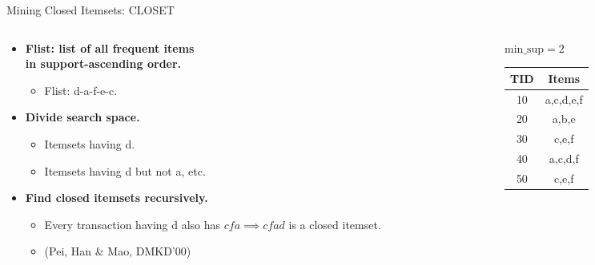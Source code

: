 \begin{frame}{Mining Closed Itemsets: CLOSET}
	\begin{columns}
		\begin{column}{0.6\textwidth}
			\begin{itemize}
				\item \textbf{Flist: list of all frequent items \\ in 
				support-ascending order.}
				\begin{itemize}
					\item Flist: d-a-f-e-c.
				\end{itemize}
				\item \textbf{Divide search space.}
				\begin{itemize}
					\item Itemsets having d.
					\item Itemsets having d but not a, etc.
				\end{itemize}
				\item \textbf{Find closed itemsets recursively.}
				\begin{itemize}
					\item Every transaction having d also has $cfa \implies 
					cfad$ is a closed itemset.
					\item (Pei, Han \& Mao, DMKD'00)
				\end{itemize}
			\end{itemize}
		\end{column}
		\begin{column}{0.3\textwidth}
			$\text{min\_sup} =2$ \\[0.2cm]
			\begin{tabular}{|c|c|}
				\hline
				TID & Items \\\hline
				10 & a,c,d,e,f \\\hline
				20 & a,b,e \\\hline
				30 & c,e,f \\\hline
				40 & a,c,d,f \\\hline
				50 & c,e,f \\\hline
			\end{tabular}
		\end{column}
	\end{columns}
\end{frame}


